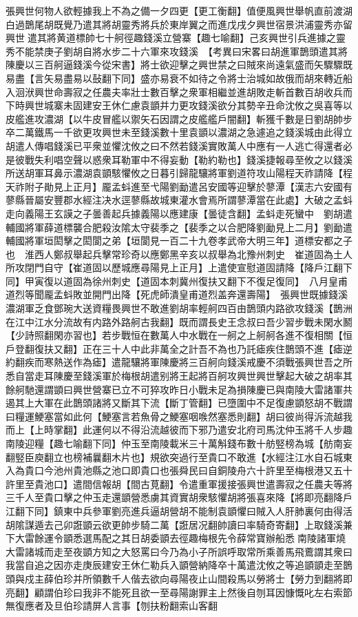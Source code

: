 張興世何物人欲輕據我上不為之備一夕四更【更工衡翻】值便風興世舉帆直前渡湖白過鵲尾胡既覺乃遣其將胡靈秀將兵於東岸翼之而進戊戌夕興世宿景洪浦靈秀亦留興世遣其將黄道標帥七十舸徑趣錢溪立營寨【趣七喻翻】己亥興世引兵進據之靈秀不能禁庚子劉胡自將水步二十六軍來攻錢溪　【考異曰宋畧曰胡進軍鵲頭遣其將陳慶以三百舸逼錢溪今從宋書】將士欲迎擊之興世禁之曰賊來尚遠氣盛而矢驟驟既易盡【言矢易盡易以鼔翻下同】盛亦易衰不如待之令將士治城如故俄而胡來轉近船入洄洑興世命壽寂之任農夫率壯士數百擊之衆軍相繼並進胡敗走斬首數百胡收兵而下時興世城寨未固建安王休仁慮袁顗并力更攻錢溪欲分其勢辛丑命沈攸之吳喜等以皮艦進攻濃湖【以牛皮冒艦以禦矢石因謂之皮艦艦戶闇翻】斬獲千數是日劉胡帥步卒二萬鐵馬一千欲更攻興世未至錢溪數十里袁顗以濃湖之急遽追之錢溪城由此得立胡遣人傳唱錢溪已平衆並懼沈攸之曰不然若錢溪實敗萬人中應有一人逃亡得還者必是彼戰失利唱空聲以惑衆耳勒軍中不得妄動【勒約勒也】錢溪捷報尋至攸之以錢溪所送胡軍耳鼻示濃湖袁顗駭懼攸之日暮引歸龍驤將軍劉道符攻山陽程天祚請降【程天祚附子勛見上正月】龎孟蚪進至弋陽劉勔遣呂安國等迎擊於蓼潭【漢志六安國有蓼縣晉屬安豐郡水經注决水逕蓼縣故城東灌水會焉所謂蓼潭當在此處】大破之孟蚪走向義陽王玄謨之子曇善起兵據義陽以應建康【曇徒含翻】孟蚪走死蠻中　劉胡遣輔國將軍薛道標襲合肥殺汝隂太守裴季之【裴季之以合肥降劉勔見上二月】劉勔遣輔國將軍垣閎擊之閎閬之弟【垣閬見一百二十九卷孝武帝大明三年】道標安都之子也　淮西人鄭叔舉起兵擊常珍奇以應鄭黑辛亥以叔舉為北豫州刺史　崔道固為土人所攻閉門自守【崔道固以歷城應尋陽見上正月】上遣使宣慰道固請降【降戶江翻下同】甲寅復以道固為徐州刺史【道固本刺冀州復扶又翻下不復足復同】　八月皇甫道烈等聞龎孟蚪敗並開門出降【死虎師潰皇甫道烈盖奔還壽陽】　張興世既據錢溪濃湖軍乏食鄧琬大送資糧畏興世不敢進劉胡率輕舸四百由鵲頭内路欲攻錢溪【鵲洲在江中江水分流故有内路外路舸古我翻】既而謂長史王念叔曰吾少習步戰未閑水鬭【少詩照翻閑亦習也】若步戰恒在數萬人中水戰在一舸之上舸舸各進不復相關【恒戶登翻復扶又翻】正在三十人中此非萬全之計吾不為也乃託瘧疾住鵲頭不進【瘧逆約翻疾而寒熱送作為瘧】遣龍驤將軍陳慶將三百舸向錢溪戒慶不須戰張興世吾之所悉自當走耳陳慶至錢溪軍於梅根胡遣别將王起將百舸攻興世興世擊起大破之胡率其餘舸馳還謂顗曰興世營寨已立不可猝攻昨日小戰未足為損陳慶已與南陵大雷諸軍共遏其上大軍在此鵲頭諸將又斷其下流【斷丁管翻】已墮圍中不足復慮顗怒胡不戰謂曰糧運鯁塞當如此何【鯁塞言若魚骨之鯁塞咽㗋然塞悉則翻】胡曰彼尚得泝流越我而上【上時掌翻】此運何以不得沿流越彼而下邪乃遣安北府司馬沈仲玉將千人步趣南陵迎糧【趣七喻翻下同】仲玉至南陵載米三十萬斛錢布數十舫竪榜為城【舫南妄翻竪臣庾翻立也榜補曩翻木片也】規欲突過行至貴口不敢進【水經注江水自石城東入為貴口今池州貴池縣之池口即貴口也張舜民曰自銅陵舟六十許里至梅根港又五十許里至貴池口】遣間信報胡【間古莧翻】令遣重軍援接張興世遣壽寂之任農夫等將三千人至貴口擊之仲玉走還顗營悉虜其資實胡衆駭懼胡將張喜來降【將即亮翻降戶江翻下同】鎮東中兵參軍劉亮進兵逼胡營胡不能制袁顗懼曰賊入人肝肺裏何由得活胡隂謀遁去己卯誑顗云欲更帥步騎二萬【誑居况翻帥讀曰率騎奇寄翻】上取錢溪兼下大雷餘運令顗悉選馬配之其日胡委顗去徑趣梅根先令薛常寶辦船悉南陵諸軍燒大雷諸城而走至夜顗方知之大怒罵曰今乃為小子所誤呼取常所乘善馬飛鷰謂其衆曰我當自追之因亦走庚辰建安王休仁勒兵入顗營納降卒十萬遣沈攸之等追顗顗走至鵲頭與戍主薛伯珍并所領數千人偕去欲向尋陽夜止山間殺馬以勞將士【勞力到翻將即亮翻】顧謂伯珍曰我非不能死且欲一至尋陽謝罪主上然後自刎耳因慷慨叱左右索節無復應者及旦伯珍請屏人言事【刎扶粉翻索山客翻